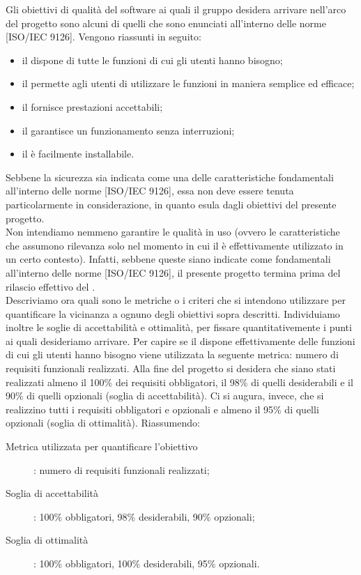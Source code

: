 				Gli obiettivi di qualità del software ai quali il gruppo \groupname{} desidera arrivare nell'arco del progetto sono alcuni di quelli che sono enunciati all'interno delle norme [ISO/IEC 9126]. Vengono riassunti in seguito:
				\begin{itemize}
					\item il  dispone di tutte le funzioni di cui gli utenti hanno bisogno;
					\item il  permette agli utenti di utilizzare le funzioni in maniera semplice ed efficace;
					\item il  fornisce prestazioni accettabili;
					\item il  garantisce un funzionamento senza interruzioni;
					\item il  è facilmente installabile.
				\end{itemize}
				Sebbene la sicurezza sia indicata come una delle caratteristiche fondamentali all'interno delle norme [ISO/IEC 9126], essa non deve essere tenuta particolarmente in considerazione, in quanto esula dagli obiettivi del presente progetto.\\
				Non intendiamo nemmeno garantire le qualità in uso (ovvero le caratteristiche che assumono rilevanza solo nel momento in cui il  è effettivamente utilizzato in un certo contesto). Infatti, sebbene queste siano indicate come fondamentali all'interno delle norme [ISO/IEC 9126], il presente progetto termina prima del rilascio effettivo del .\\
				Descriviamo ora quali sono le metriche o i criteri che si intendono utilizzare per quantificare la vicinanza a ognuno degli obiettivi sopra descritti. Individuiamo inoltre le soglie di accettabilità e ottimalità, per fissare quantitativemente i punti ai quali desideriamo arrivare.
					Per capire se il  dispone effettivamente delle funzioni di cui gli utenti hanno bisogno viene utilizzata la seguente metrica: numero di requisiti funzionali realizzati. Alla fine del progetto si desidera che siano stati realizzati almeno il 100\% dei requisiti obbligatori, il 98\% di quelli desiderabili e il 90\% di quelli opzionali (soglia di accettabilità). Ci si augura, invece, che si realizzino tutti i requisiti obbligatori e opzionali e almeno il 95\% di quelli opzionali (soglia di ottimalità). Riassumendo:
					\begin{description}
						\item[Metrica utilizzata per quantificare l'obiettivo]: numero di requisiti funzionali realizzati;
						\item[Soglia di accettabilità]: 100\% obbligatori, 98\% desiderabili, 90\% opzionali;
						\item[Soglia di ottimalità]: 100\% obbligatori, 100\% desiderabili, 95\% opzionali.
					\end{description}
